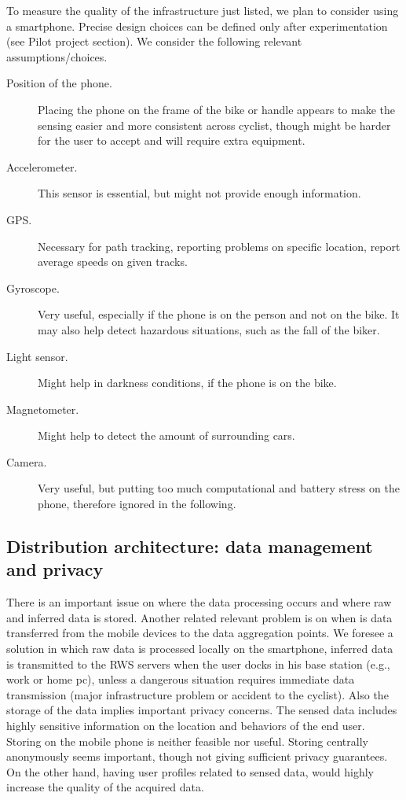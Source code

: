 \documentclass[preprint,12pt]{elsarticle}
\theoremstyle{definition}
\begin{document}
To measure the quality of the infrastructure just listed, we plan to
consider using a smartphone. Precise design choices can be defined
only after experimentation (see Pilot project section). We consider
the following relevant assumptions/choices.
\begin{description}
\item[Position of the phone.] Placing the phone on the frame of the
  bike or handle appears to make the sensing easier and more
  consistent across cyclist, though might be harder for the user to
  accept and will require extra equipment.
\item[Accelerometer.] This sensor is essential, but might not provide
  enough information.
\item[GPS.] Necessary for path tracking, reporting problems on
  specific location, report average speeds on given tracks.
\item[Gyroscope.] Very useful, especially if the phone is on the
  person and not on the bike. It may also help detect hazardous
  situations, such as the fall of the biker.
\item[Light sensor.] Might help in darkness conditions, if the phone
  is on the bike.
\item[Magnetometer.] Might help to detect the amount of surrounding
  cars.
\item[Camera.] Very useful, but putting too much computational and
  battery stress on the phone, therefore ignored in the following.
\end{description}


\subsection{Distribution architecture: data management and privacy}

There is an important issue on where the data processing occurs and
where raw and inferred data is stored. Another related relevant
problem is on when is data transferred from the mobile devices to the
data aggregation points. We foresee a solution in which raw data is
processed locally on the smartphone, inferred data is transmitted to
the RWS servers when the user docks in his base station (e.g., work or
home pc), unless a dangerous situation requires immediate data transmission
(major infrastructure problem or accident to the cyclist). Also the
storage of the data implies important privacy concerns. The sensed
data includes highly sensitive information on the location and
behaviors of the end user. Storing on the mobile phone is neither
feasible nor useful. Storing centrally anonymously seems important,
though not giving sufficient privacy guarantees. On the other hand,
having user profiles related to sensed data, would highly increase the
quality of the acquired data.
\end{document}
